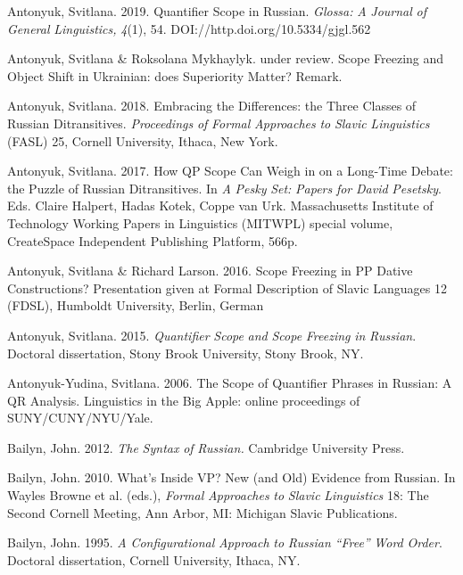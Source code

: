 \documentclass[output=paper,modfonts, nonflat]{langsci/langscibook}
\begin{document}
\begin{styleinnerExample}
Antonyuk, Svitlana. 2019. Quantifier Scope in Russian. \textit{Glossa:} \textit{A} \textit{Journal} \textit{of} \textit{General} \textit{Linguistics,} \textit{4}(1), 54. DOI://http.doi.org/10.5334/gjgl.562

Antonyuk, Svitlana \& Roksolana Mykhaylyk. under review. Scope Freezing and Object Shift in Ukrainian: does Superiority Matter? Remark.

Antonyuk, Svitlana. 2018. Embracing the Differences: the Three Classes of Russian Ditransitives. \textit{Proceedings} \textit{of} \textit{Formal} \textit{Approaches} \textit{to} \textit{Slavic} \textit{Linguistics} (FASL) 25, Cornell University, Ithaca, New York.

Antonyuk, Svitlana. 2017. How QP Scope Can Weigh in on a Long-Time Debate: the Puzzle of Russian Ditransitives. In \textit{A} \textit{Pesky} \textit{Set:} \textit{Papers} \textit{for} \textit{David} \textit{Pesetsky}. Eds. Claire Halpert, Hadas Kotek, Coppe van Urk. Massachusetts Institute of Technology Working Papers in Linguistics (MITWPL) special volume, CreateSpace Independent Publishing Platform, 566p.

Antonyuk, Svitlana \& Richard Larson. 2016. Scope Freezing in PP Dative Constructions? Presentation given at Formal Description of Slavic Languages 12 (FDSL), Humboldt University, Berlin, German

Antonyuk, Svitlana. 2015. \textit{Quantifier} \textit{Scope} \textit{and} \textit{Scope} \textit{Freezing} \textit{in} \textit{Russian}. Doctoral dissertation, Stony Brook University, Stony Brook, NY.

Antonyuk-Yudina, Svitlana. 2006. The Scope of Quantifier Phrases in Russian: A QR Analysis. Linguistics in the Big Apple: online proceedings of SUNY/CUNY/NYU/Yale.

Bailyn, John. 2012. \textit{The} \textit{Syntax} \textit{of} \textit{Russian.} Cambridge University Press.

\begin{styleNormalWeb}
Bailyn, John. 2010. What’s Inside VP? New (and Old) Evidence from Russian. In Wayles Browne et al. (eds.), \textit{Formal} \textit{Approaches} \textit{to} \textit{Slavic} \textit{Linguistics} 18: The Second Cornell Meeting, Ann Arbor, MI: Michigan Slavic Publications. 
\end{styleNormalWeb}

Bailyn, John. 1995. \textit{A} \textit{Configurational} \textit{Approach} \textit{to} \textit{Russian} \textit{“Free”} \textit{Word} \textit{Order}. Doctoral dissertation, Cornell University, Ithaca, NY.


\end{styleinnerExample}
\end{document}
